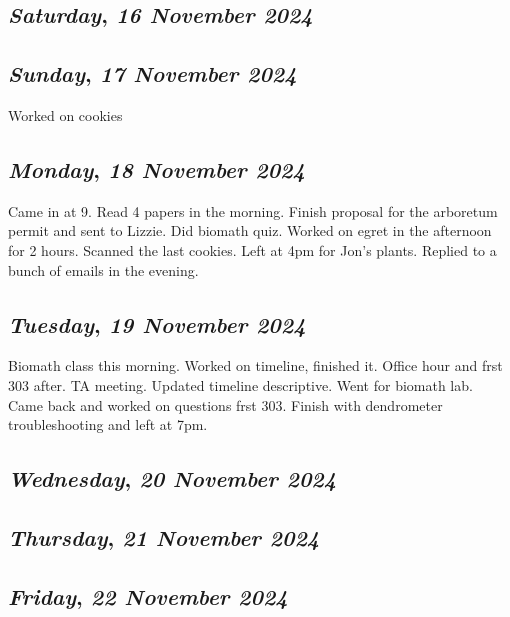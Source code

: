 \def\day{\textit{16 November 2024}}
\def\weekday{\textit{Saturday}}
\subsection*{\weekday, \day}

\def\day{\textit{17 November 2024}}
\def\weekday{\textit{Sunday}}
\subsection*{\weekday, \day}
Worked on cookies

\def\day{\textit{18 November 2024}}
\def\weekday{\textit{Monday}}
\subsection*{\weekday, \day}
Came in at 9. Read 4 papers in the morning. Finish proposal for the arboretum permit and sent to Lizzie. Did biomath quiz. Worked on egret in the afternoon for 2 hours. Scanned the last cookies. Left at 4pm for Jon's plants. Replied to  a bunch of emails in the evening.

\def\day{\textit{19 November 2024}}
\def\weekday{\textit{Tuesday}}
\subsection*{\weekday, \day}
Biomath class this morning. Worked on timeline, finished it. Office hour and frst 303 after. TA meeting. Updated timeline descriptive. Went for biomath lab. Came back and worked on questions frst 303. Finish with dendrometer troubleshooting and left at 7pm. 

\def\day{\textit{20 November 2024}}
\def\weekday{\textit{Wednesday}}
\subsection*{\weekday, \day}

\def\day{\textit{21 November 2024}}
\def\weekday{\textit{Thursday}}
\subsection*{\weekday, \day}

\def\day{\textit{22 November 2024}}
\def\weekday{\textit{Friday}}
\subsection*{\weekday, \day}

